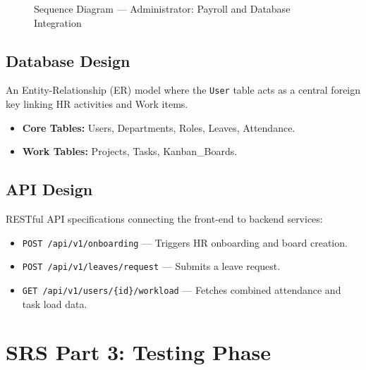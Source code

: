 \documentclass[12pt,a4paper]{report}
\begin{document}
\begin{figure}[htbp]
\caption{Sequence Diagram --- Administrator: Payroll and Database Integration}
\end{figure}

\vspace{0.8cm}

\subsection{Database Design}
An Entity-Relationship (ER) model where the \texttt{User} table acts as a central foreign key
linking HR activities and Work items.
\begin{itemize}
  \item \textbf{Core Tables:} Users, Departments, Roles, Leaves, Attendance.
  \item \textbf{Work Tables:} Projects, Tasks, Kanban\_Boards.
\end{itemize}

\subsection{API Design}
RESTful API specifications connecting the front-end to backend services:
\begin{itemize}
  \item \texttt{POST /api/v1/onboarding} --- Triggers HR onboarding and board creation.
  \item \texttt{POST /api/v1/leaves/request} --- Submits a leave request.
  \item \texttt{GET /api/v1/users/\{id\}/workload} --- Fetches combined attendance and task load data.
\end{itemize}

\section{SRS Part 3: Testing Phase}
\end{document}
